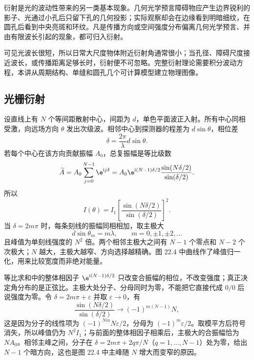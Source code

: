 衍射是光的波动性带来的另一类基本现象。几何光学预言障碍物应产生边界锐利的影子、光通过小孔后只留下孔的几何投影；实际观察却会在边缘看到明暗细纹，在圆孔后看到中央亮斑和环纹。凡是传播方向或空间强度分布偏离几何光学预言、并由有限波长引起的现象，都可归入衍射。

可见光波长很短，所以日常大尺度物体附近衍射角通常很小；当孔径、障碍尺度接近波长，或传播距离足够长时，衍射便不可忽略。完整衍射理论需要积分波动方程，本讲从周期结构、单缝和圆孔几个可计算模型建立物理图像。

\BasicDiffractionPanel

\subsection*{光栅衍射}

设直线上有 $N$ 个等间距散射中心，间距为 $d$，单色平面波正入射。所有中心同相受激，向远场方向 $\theta$ 发出次级波。相邻中心到探测器的程差为 $d\sin\theta$，相位差
\begin{equation}
 \delta=\frac{2\pi}{\lambda}d\sin\theta.
\end{equation}
若每个中心在该方向贡献振幅 $A_0$，总复振幅是等比级数
\[
 \widetilde A=A_0\sum_{j=0}^{N-1}\e^{\mathrm i j\delta}
 =A_0\e^{\mathrm i(N-1)\delta/2}\frac{\sin(N\delta/2)}{\sin(\delta/2)}.
\]
所以
\begin{equation}
 I(\theta)=I_1\left[\frac{\sin(N\delta/2)}{\sin(\delta/2)}\right]^2.
\end{equation}
当 $\delta=2m\pi$ 时，每条刻线的振幅同相相加，取主极大
\begin{equation}
 d\sin\theta_m=m\lambda,\qquad m=0,\pm1,\pm2,\ldots
\end{equation}
且峰值为单刻线强度的 $N^2$ 倍。两个相邻主极大之间有 $N-1$ 个零点和 $N-2$ 个次极大；$N$ 越大，主极大越窄、方向选择越精确。图 22.4 中曲线作了峰值归一化，用来比较宽度而非绝对能量。

等比求和中的整体相因子 $\e^{\mathrm i(N-1)\delta/2}$ 只改变合振幅的相位，不改变强度；真正决定角分布的是正弦比。主极大处分子、分母同时为零，不能把它直接代成 $0/0$ 后说强度为零。令 $\delta=2m\pi+\varepsilon$ 并取 $\varepsilon\to0$，有
\[
 \frac{\sin(N\delta/2)}{\sin(\delta/2)}\longrightarrow(-1)^{m(N-1)}N,
\]
这是因为分子的线性项为 $(-1)^{Nm}N\varepsilon/2$，分母为 $(-1)^m\varepsilon/2$。取模平方后符号消失，所以峰值仍为 $N^2I_1$；与前面的整体相因子相乘后，主极大的合振幅恰为 $NA_0$。相邻主峰之间，分子在 $\delta=2m\pi+2q\pi/N$（$q=1,\ldots,N-1$）处为零，给出 $N-1$ 个暗方向，这也是图 22.4 中主峰随 $N$ 增大而变窄的原因。

